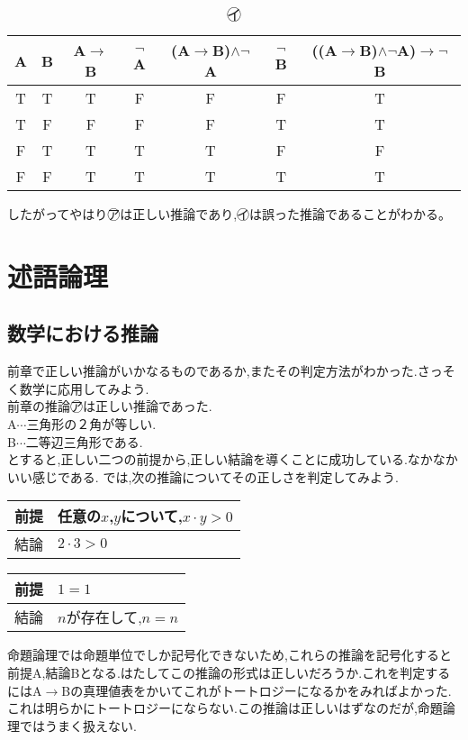 \documentclass[10pt,b5paper,papersize,dvipdfmx]{jsbook}
\begin{document}
\begin{table}[H]
\begin{center}
\caption{\textcircled{\scriptsize イ}}
\begin{tabular}{|c|c||c|c|c|c|c|}\hline
A&B&A$\to$B&$\lnot$A&(A$\to$B)$\land\lnot$A&$\lnot$B&((A$\to$B)$\land\lnot$A)$\to\lnot$B \\ \hline \hline
T&T&T&F&F&F&T \\ \hline
T&F&F&F&F&T&T \\ \hline
F&T&T&T&T&F&F \\ \hline
F&F&T&T&T&T&T \\ \hline
\end{tabular}
\end{center}
\end{table}
したがってやはり\textcircled{\scriptsize ア}は正しい推論であり,\textcircled{\scriptsize イ}は誤った推論であることがわかる。

\section{述語論理}
\subsection{数学における推論}
前章で正しい推論がいかなるものであるか,またその判定方法がわかった.さっそく数学に応用してみよう.\\
前章の推論\textcircled{\scriptsize ア}は正しい推論であった.\\
A$\cdots$三角形の２角が等しい.\\
B$\cdots$二等辺三角形である.\\
とすると,正しい二つの前提から,正しい結論を導くことに成功している.なかなかいい感じである.
では,次の推論についてその正しさを判定してみよう.\\
\begin{table}[H]
\begin{tabular}{ll}
前提&任意の$x$,$y$について,$x\cdot y>0$ \\ \hline
結論&$2\cdot 3>0$\\
\end{tabular}
\end{table}
\begin{table}[H]
\begin{tabular}{ll}
前提&$1=1$ \\ \hline
結論&$n$が存在して,$n=n$\\
\end{tabular}
\end{table}
命題論理では命題単位でしか記号化できないため,これらの推論を記号化すると前提A,結論Bとなる.はたしてこの推論の形式は正しいだろうか.これを判定するにはA$\to$Bの真理値表をかいてこれがトートロジーになるかをみればよかった.これは明らかにトートロジーにならない.この推論は正しいはずなのだが,命題論理ではうまく扱えない.
\end{document}
